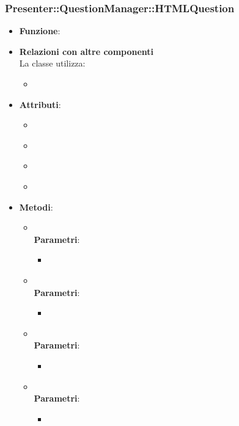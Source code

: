 \subsubsection{Presenter::QuestionManager::HTMLQuestion}
\begin{itemize}
\item\textbf{Funzione}:
\item\textbf{Relazioni con altre componenti}\\
La classe utilizza:
	\begin{itemize}
		\item
	\end{itemize}
\item\textbf{Attributi}:
	\begin{itemize}
		\item\code{}\\
		\item\code{}\\
		\item\code{}\\
		\item\code{}\\
	\end{itemize}
\item\textbf{Metodi}:
	\begin{itemize}
		\item\code{}\\
		\textbf{Parametri}:
			\begin{itemize}
				\item\code{}\\
			\end{itemize}
		\item\code{}\\
		\textbf{Parametri}:
			\begin{itemize}
				\item\code{}\\
			\end{itemize}
		\item\code{}\\
		\textbf{Parametri}:
			\begin{itemize}
				\item\code{}\\
			\end{itemize}
		\item\code{}\\
		\textbf{Parametri}:
			\begin{itemize}
				\item\code{}\\
			\end{itemize}
	\end{itemize}
\end{itemize}


